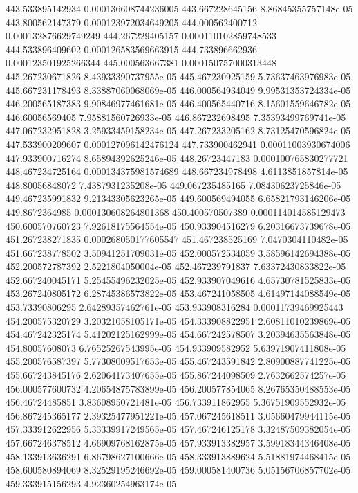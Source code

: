{443.533895142934 0.000136608744236005
443.667228645156 8.86845355757148e-05
443.800562147379 0.000123972034649205
444.000562400712 0.000132876629749249
444.267229405157 0.000110102859748533
444.533896409602 0.000126583569663915
444.733896662936 0.000123501925266344
445.000563667381 0.000150757000313448
445.267230671826 8.43933390737955e-05
445.467230925159 5.73637463976983e-05
445.667231178493 8.33887060068069e-05
446.000564934049 9.99531353724334e-05
446.200565187383 9.90846977461681e-05
446.400565440716 8.15601559646782e-05
446.60056569405 7.95881560726933e-05
446.867232698495 7.35393499769741e-05
447.067232951828 3.25933459158234e-05
447.267233205162 8.73125470596824e-05
447.533900209607 0.000127096142476124
447.733900462941 0.00011003930674006
447.933900716274 8.65894392625246e-05
448.26723447183 0.000100765830277721
448.467234725164 0.000134375981574689
448.667234978498 4.6113851857814e-05
448.80056848072 7.4387931235208e-05
449.067235485165 7.08430623725846e-05
449.467235991832 9.21343305623265e-05
449.600569494055 6.65821793146206e-05
449.8672364985 0.000130608264801368
450.400570507389 0.000114014585129473
450.600570760723 7.92618175564554e-05
450.933904516279 6.20316673739678e-05
451.267238271835 0.000268050177605547
451.467238525169 7.0470304110482e-05
451.667238778502 3.50941251709031e-05
452.000572534059 3.58596142694388e-05
452.200572787392 2.5221804050004e-05
452.467239791837 7.63372430833822e-05
452.667240045171 5.25455496232025e-05
452.933907049616 4.65730781525833e-05
453.267240805172 6.28745386573822e-05
453.467241058505 4.61497144088549e-05
453.73390806295 2.64289357462761e-05
453.933908316284 0.00011739469925443
454.200575320729 3.20321058105171e-05
454.333908822951 2.60811010239869e-05
454.467242325174 5.41202125162999e-05
454.667242578507 3.20394635563848e-05
454.80057608073 6.76525267543995e-05
454.933909582952 5.63971907411808e-05
455.200576587397 5.77308009517653e-05
455.467243591842 2.80900887741225e-05
455.667243845176 2.62064173407655e-05
455.867244098509 2.7632662574257e-05
456.000577600732 4.20654875783899e-05
456.200577854065 8.26765350488553e-05
456.46724485851 3.83608950721481e-05
456.733911862955 5.36751909552932e-05
456.867245365177 2.39325477951221e-05
457.067245618511 3.05660479944115e-05
457.333912622956 5.33339917249565e-05
457.467246125178 3.32487509382054e-05
457.667246378512 4.66909768162875e-05
457.933913382957 3.59918344346408e-05
458.133913636291 6.86798627100666e-05
458.333913889624 5.51881974468415e-05
458.600580894069 8.32529195246692e-05
459.000581400736 5.05156706857702e-05
459.333915156293 4.92360254963174e-05
}
